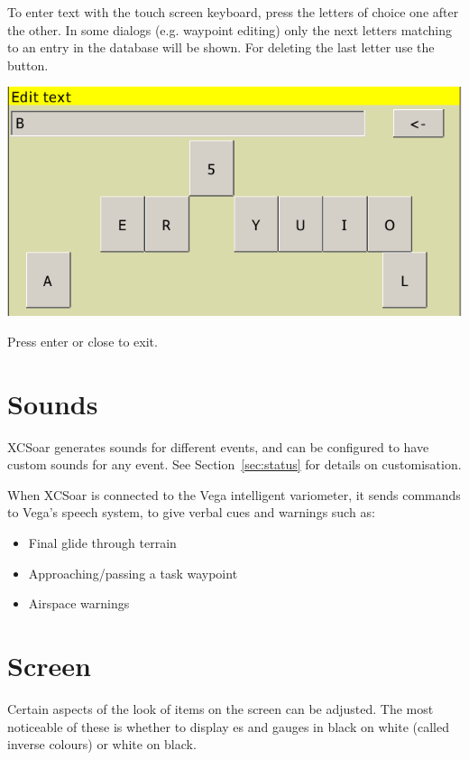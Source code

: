\documentclass[a4paper,12pt]{refrep}
\begin{document}
To enter text with the touch screen keyboard, press the letters of choice one after the other. In some dialogs (e.g. waypoint editing) only the next letters matching to an entry in the database will be shown. For deleting the last letter use the \button{$<-$} button.

\begin{center}
\includegraphics[angle=0,width=\linewidth,keepaspectratio='true']{figures/textentry_keyboard.png}
\end{center}

Press enter or close to exit.

\section{Sounds}

XCSoar generates sounds for different events, and can be configured to
have custom sounds for any event.  See Section~\ref{sec:status} for
details on customisation.

When XCSoar is connected to the Vega intelligent variometer, it sends
commands to Vega's speech system, to give verbal cues and warnings such as:
\begin{itemize}
\item Final glide through terrain
\item Approaching/passing a task waypoint
\item Airspace warnings
\end{itemize}

\section{Screen}

Certain aspects of the look of items on the screen can be adjusted.
The most noticeable of these is whether to display {\InfoBox}es and
gauges in black on white (called inverse colours) or white on black.
\end{document}
